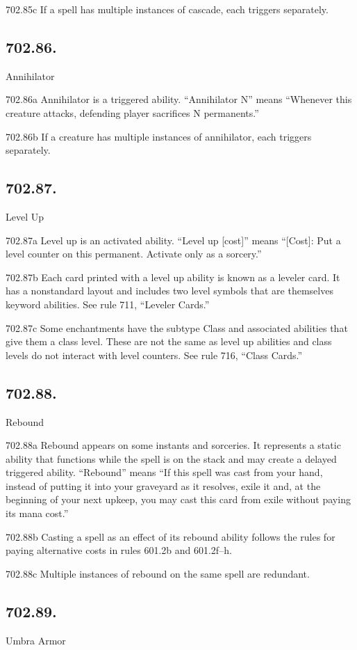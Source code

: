 702.85c If a spell has multiple instances of cascade, each triggers separately.

\subsection*{702.86.}
Annihilator

702.86a Annihilator is a triggered ability. “Annihilator N” means “Whenever this creature attacks, defending player sacrifices N permanents.”

702.86b If a creature has multiple instances of annihilator, each triggers separately.

\subsection*{702.87.}
Level Up

702.87a Level up is an activated ability. “Level up [cost]” means “[Cost]: Put a level counter on this permanent. Activate only as a sorcery.”

702.87b Each card printed with a level up ability is known as a leveler card. It has a nonstandard layout and includes two level symbols that are themselves keyword abilities. See rule 711, “Leveler Cards.”

702.87c Some enchantments have the subtype Class and associated abilities that give them a class level. These are not the same as level up abilities and class levels do not interact with level counters. See rule 716, “Class Cards.”

\subsection*{702.88.}
Rebound

702.88a Rebound appears on some instants and sorceries. It represents a static ability that functions while the spell is on the stack and may create a delayed triggered ability. “Rebound” means “If this spell was cast from your hand, instead of putting it into your graveyard as it resolves, exile it and, at the beginning of your next upkeep, you may cast this card from exile without paying its mana cost.”

702.88b Casting a spell as an effect of its rebound ability follows the rules for paying alternative costs in rules 601.2b and 601.2f–h.

702.88c Multiple instances of rebound on the same spell are redundant.

\subsection*{702.89.}
Umbra Armor

